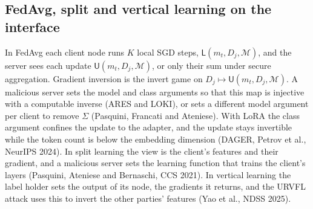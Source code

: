 \documentclass{labreport}
\newcommand{\Mc}{\mathcal{M}}
\newcommand{\Lf}{\mathsf{L}}
\newcommand{\U}{\mathsf{U}}
\begin{document}
\subsection*{FedAvg, split and vertical learning on the interface}
In FedAvg each client node runs $K$ local SGD steps, $\Lf(m_t, D_j, \Mc)$, and
the server sees each update $\U(m_t, D_j, \Mc)$, or only their sum under secure
aggregation. Gradient inversion is the invert game on
$D_j \mapsto \U(m_t, D_j, \Mc)$. A malicious server sets the model and class
arguments so that this map is injective with a computable inverse (ARES and
LOKI), or sets a different model argument per client to remove $\Sigma$
(Pasquini, Francati and Ateniese). With LoRA the class argument confines the
update to the adapter, and the update stays invertible while the token count is
below the embedding dimension (DAGER, Petrov et al., NeurIPS 2024). In split
learning the view is the client's features and their gradient, and a malicious
server sets the learning function that trains the client's layers (Pasquini,
Ateniese and Bernaschi, CCS 2021). In vertical learning the label holder sets
the output of its node, the gradients it returns, and the URVFL attack uses this
to invert the other parties' features (Yao et al., NDSS 2025).
\end{document}
